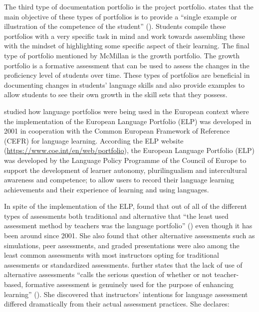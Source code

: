 \documentclass[output=paper]{langscibook}
\begin{document}
The third type of documentation portfolio is the project portfolio. \citeauthor{McMillan2018} states that the main objective of these types of portfolios is to provide a “single example or illustration of the competence of the student” (\citeyear[304]{McMillan2018}). Students compile these portfolios with a very specific task in mind and work towards assembling these with the mindset of highlighting some specific aspect of their learning. The final type of portfolio mentioned by McMillan is the growth portfolio. The growth portfolio is a formative assessment that can be used to assess the changes in the proficiency level of students over time. These types of portfolios are beneficial in documenting changes in students’ language skills and also provide examples to allow students to see their own growth in the skill sets that they possess.

\citet{Wewer2020} studied how language portfolios were being used in the European context where the implementation of the European Language Portfolio (ELP) was developed in 2001 in cooperation with the Common European Framework of Reference (CEFR) for language learning. According the ELP website  (\url{https://www.coe.int/en/web/portfolio}), the European Language Portfolio (ELP) was developed by the Language Policy Programme of the Council of Europe \citep{CouncilofEurope2001} to support the development of learner autonomy, pluri\-lin\-gualism and intercultural awareness and competence; to allow users to record their language learning achievements and their experience of learning and using languages.

In spite of the implementation of the ELP, \citet{Wewer2020} found that out of all of the different types of assessments both traditional and alternative that “the least used assessment method by teachers was the language portfolio” (\citeyear[150]{Wewer2020}) even though it has been around since 2001. She also found that other alternative assessments such as simulations, peer assessments, and graded presentations were also among the least common assessments with most instructors opting for traditional assessments or standardized assessments. \citet{Wewer2020} further states that the lack of use of alternative assessments “calls the serious question of whether or not teacher-based, formative assessment is genuinely used for the purpose of enhancing learning” (\citeyear[150]{Wewer2020}). She discovered that instructors’ intentions for language assessment differed dramatically from their actual assessment practices. She declares:
\end{document}
